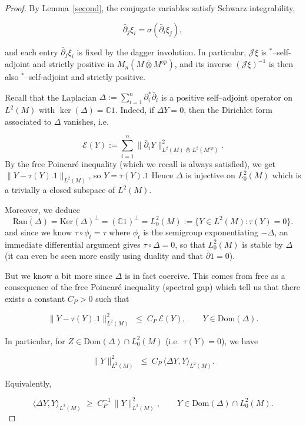 \documentclass[10pt,a4paper,reqno]{amsart}
\newcommand{\C}{\mathbb{C}}
\newcommand{\Dom}{\mathrm{Dom}}
\begin{document}
\begin{proof}
By Lemma~\ref{second}, the conjugate variables satisfy Schwarz integrability,


\[
\bar{\partial}_j\xi_i=\sigma(\bar{\partial}_i \xi_j),
\]


and each entry $\bar\partial_j\xi_i$ is fixed by the dagger involution. In particular,
$\mathscr J\xi$ is $^\ast$–self-adjoint and strictly positive in
$M_n(M\bar\otimes M^{op})$, and its inverse $(\mathscr{J}\xi)^{-1}$ is then also
$^\ast$–self-adjoint and strictly positive.

\medskip
Recall that the Laplacian $
\Delta := \sum_{i=1}^n \partial_i^\ast \bar\partial_i
$
is a positive self–adjoint operator on $L^2(M)$ with $\ker(\Delta)=\C 1$.  Indeed, if $\Delta Y=0$, then the
Dirichlet form associated to $\Delta$ vanishes, i.e. 

\[
\mathcal E(Y)
:=
\sum_{i=1}^n \|\bar\partial_i Y\|_{L^2(M)\,\bar\otimes\,L^2(M^{op})}^2.
\]
By the free Poincaré inequality (which we recall is always satisfied), we get $\lVert Y-\tau(Y).1\rVert_{L^2(M)}$, so $Y=\tau(Y).1$ Hence $\Delta$ is injective on $L^2_0(M)$ which is a trivially a closed subspace of $L^2(M)$.

Moreover, we deduce
\begin{equation}
    \overline{\mathrm{Ran}(\Delta)}=\mathrm{Ker}(\Delta)^{\perp}=(\mathbb{C}1)^{\perp}=L_0^2(M):=\{Y\in L^2(M):\tau(Y)=0\}.
\end{equation}
and since we know $\tau\circ \phi_t=\tau$ where $\phi_t$ is the semigroup exponentiating $-\Delta$, an immediate differential argument gives $\tau\circ\Delta=0$, so that $L_0^2(M)$ is stable by $\Delta$ (it can even be seen more easily using duality and that $\bar\partial 1=0$).
\bigbreak

But we know a bit more since $\Delta$ is in fact coercive. This comes from free as a consequence of the free Poincar\'e inequality (spectral gap) which tell us that there exists a constant $C_P>0$ such that


\[
\|Y - \tau(Y).1\|_{L^2(M)}^2
\;\le\;
C_P\,\mathcal E(Y),
\qquad Y\in \Dom(\Delta).
\]


In particular, for $Z\in \Dom(\Delta)\cap L^2_0(M)$ (i.e.\ $\tau(Y)=0$), we have


\[
\|Y\|_{L^2(M)}^2
\;\le\;
C_P\,\langle \Delta Y, Y\rangle_{L^2(M)}.
\]


Equivalently,


\[
\langle \Delta Y, Y\rangle_{L^2(M)}
\;\ge\;
C_P^{-1}\,\|Y\|_{L^2(M)}^2,
\qquad Y\in \Dom(\Delta)\cap L^2_0(M).
\]




\end{proof}
\end{document}
